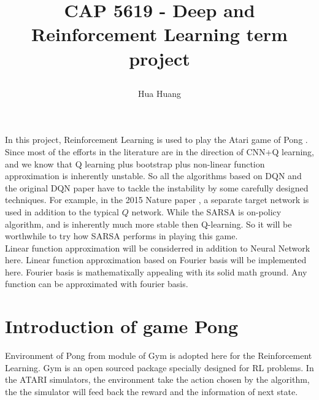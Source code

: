 \documentclass[12pt]{article}
\begin{document}
\title*{\centerline{{CAP 5619 \-- Deep and Reinforcement Learning term
project}}}
\author*{\centerline{Hua Huang}}%

In this project, Reinforcement Learning is used to play the Atari
game of Pong \cite{15atari}. Since most of the efforts in the
literature are in the direction of CNN+Q learning, and we know that Q
learning plus bootstrap plus non\--linear function approximation is
inherently unstable. So all the algorithms based on DQN and the
original DQN paper have to tackle the instability by some carefully
designed techniques. For example, in the 2015 Nature paper \cite{15atari},
a separate target network is used in addition to the typical $Q$ network.
While the SARSA is on\--policy algorithm, 
and is inherently much more stable then Q\--learning. So it will be
worthwhile to try how SARSA performs in playing this game.\\

Linear function approximation will be considerred in addition to
Neural Network here. Linear function approximation based on Fourier basis
\cite{11fourier} will be implemented here. Fourier basis is
mathematixally appealing with its solid math ground. Any function can
be approximated with fourier basis.

\section{Introduction of game Pong}
Environment of Pong from module of Gym is adopted here for the Reinforcement
Learning. Gym is an open sourced package specially designed for RL
problems. In the ATARI simulators, the environment take the action
chosen by the algorithm, the the simulator will feed back the reward
and the information of next state.\\
\end{document}
